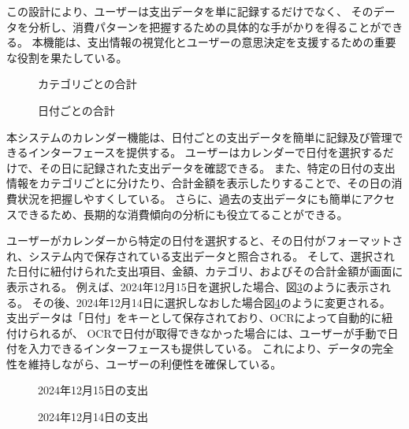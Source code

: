 \documentclass[main]{subfiles}
\begin{document}
この設計により、ユーザーは支出データを単に記録するだけでなく、
そのデータを分析し、消費パターンを把握するための具体的な手がかりを得ることができる。
本機能は、支出情報の視覚化とユーザーの意思決定を支援するための重要な役割を果たしている。

\begin{figure}[tb]
    \begin{center}
        \caption{カテゴリごとの合計}
        \label{fig:category_total}
    \end{center}
\end{figure}

\begin{figure}[tb]
    \begin{center}
        \caption{日付ごとの合計}
        \label{fig:date_total}
    \end{center}
\end{figure}

本システムのカレンダー機能は、日付ごとの支出データを簡単に記録及び管理できるインターフェースを提供する。
ユーザーはカレンダーで日付を選択するだけで、その日に記録された支出データを確認できる。
また、特定の日付の支出情報をカテゴリごとに分けたり、合計金額を表示したりすることで、その日の消費状況を把握しやすくしている。
さらに、過去の支出データにも簡単にアクセスできるため、長期的な消費傾向の分析にも役立てることができる。

ユーザーがカレンダーから特定の日付を選択すると、その日付がフォーマットされ、システム内で保存されている支出データと照合される。
そして、選択された日付に紐付けられた支出項目、金額、カテゴリ、およびその合計金額が画面に表示される。
例えば、2024年12月15日を選択した場合、図\ref{fig:12-15}のように表示される。
その後、2024年12月14日に選択しなおした場合図\ref{fig:12-14}のように変更される。
支出データは「日付」をキーとして保存されており、OCRによって自動的に紐付けられるが、
OCRで日付が取得できなかった場合には、ユーザーが手動で日付を入力できるインターフェースも提供している。
これにより、データの完全性を維持しながら、ユーザーの利便性を確保している。

\begin{figure}[tb]
    \begin{center}
        \caption{2024年12月15日の支出}
        \label{fig:12-15}
    \end{center}
\end{figure}

\begin{figure}[tb]
    \begin{center}
        \caption{2024年12月14日の支出}
        \label{fig:12-14}
    \end{center}
\end{figure}
\end{document}
